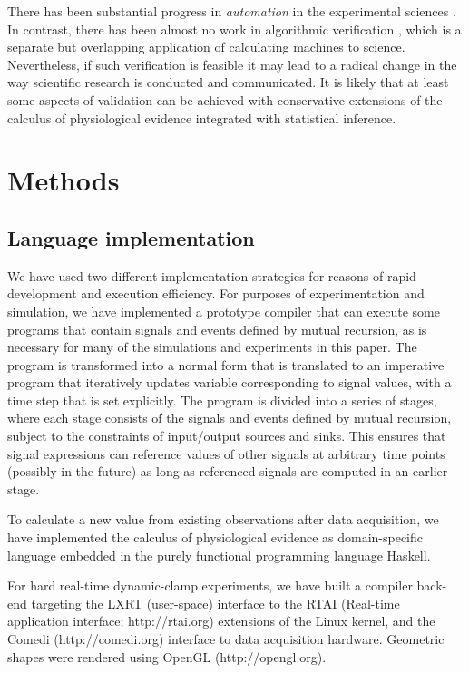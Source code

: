 There has been substantial progress in \emph{automation} in the
experimental sciences \citep{King2004}. In contrast, there has been
almost no work in algorithmic verification \citep{Kropf1999,
  Sadot}, which is a separate but overlapping application of
calculating machines to science. Nevertheless, if such verification is
feasible it may lead to a radical change in the way scientific
research is conducted and communicated. It is likely that at least
some aspects of validation can be achieved with conservative
extensions of the calculus of physiological evidence integrated with
statistical inference.

\section*{Methods}

\subsection*{Language implementation} 

We have used two different implementation strategies for reasons of
rapid development and execution efficiency. For purposes of
experimentation and simulation, we have implemented a prototype
compiler that can execute some programs that contain signals and
events defined by mutual recursion, as is necessary for many of the
simulations and experiments in this paper. The program is transformed
into a normal form that is translated to an imperative
program that iteratively updates variable corresponding to signal
values, with a time step that is set explicitly. The program is divided
into a series of stages, where each stage consists of the signals and
events defined by mutual recursion, subject to the constraints of
input/output sources and sinks. This ensures that signal expressions
can reference values of other signals at arbitrary time points
(possibly in the future) as long as referenced signals are computed in
an earlier stage.

To calculate a new value from existing observations after data
acquisition, we have implemented the calculus of physiological
evidence as domain-specific language embedded in the purely functional
programming language Haskell. 

For hard real-time dynamic-clamp experiments, we have built a compiler
back-end targeting the LXRT (user-space) interface to the RTAI (Real-time
application interface; http://rtai.org) extensions of the Linux
kernel, and the Comedi (http://comedi.org) interface to data
acquisition hardware. Geometric shapes were rendered using OpenGL
(http://opengl.org).


